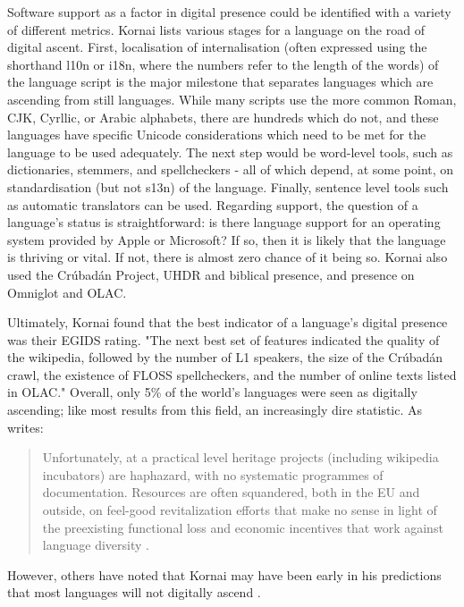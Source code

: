 Software support as a factor in digital presence could be identified with a variety of different metrics. Kornai lists various stages for a language on the road of digital ascent. First, localisation of internalisation (often expressed using the shorthand l10n or i18n, where the numbers refer to the length of the words) of the language script is the major milestone that separates languages which are ascending from still languages. While many scripts use the more common Roman, CJK, Cyrllic, or Arabic alphabets, there are hundreds which do not, and these languages have specific Unicode considerations which need to be met for the language to be used adequately. The next step would be word-level tools, such as dictionaries, stemmers, and spellcheckers - all of which depend, at some point, on standardisation (but not s13n) of the language. Finally, sentence level tools such as automatic translators can be used. Regarding support, the question of a language's status is straightforward: is there language support for an operating system provided by Apple or Microsoft? If so, then it is likely that the language is thriving or vital. If not, there is almost zero chance of it being so. Kornai also used the Cr\'ubad\'an Project, UHDR and biblical presence, and presence on Omniglot and OLAC.

Ultimately, Kornai found that the best indicator of a language's digital presence was their EGIDS rating. "The next best set of features indicated the quality of the wikipedia, followed by the number of L1 speakers, the size of the Cr\'ubad\'an crawl, the existence of FLOSS spellcheckers, and the number of online texts listed in OLAC." \citep[6]{kornai2013digital} Overall, only 5\% of the world's languages were seen as digitally ascending; like most results from this field, an increasingly dire statistic. As \citep[10]{kornai2013digital} writes:

\begin{quote}
Unfortunately, at a practical level heritage projects (including wikipedia incubators) are haphazard, with no systematic programmes of documentation. Resources are often squandered, both in the EU and outside, on feel-good revitalization efforts that make no sense in light of the preexisting functional loss and economic incentives that work against language diversity \citep{ginsburgh2011many}.
\end{quote}

However, others have noted that Kornai may have been early in his predictions that most languages will not digitally ascend \citep{gibson2016assessing}.


